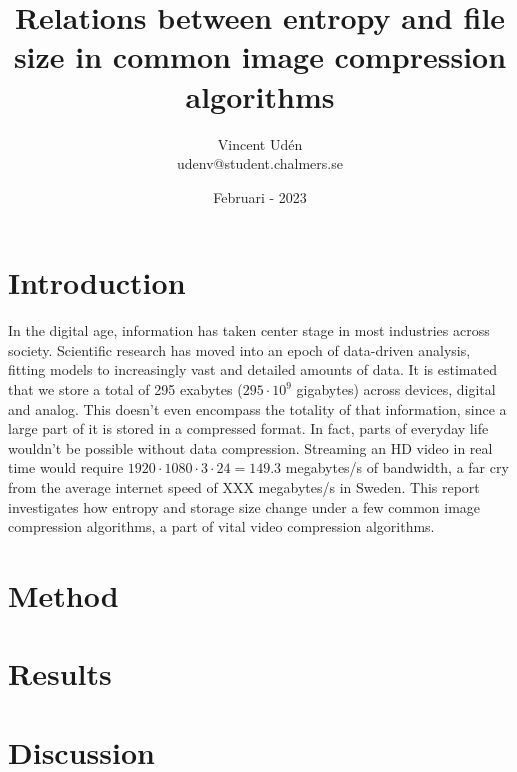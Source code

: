 \documentclass[a4paper, 12pt]{article}
\begin{document}
\title{Relations between entropy and file size in common image compression algorithms}
\author{Vincent Udén\\udenv@student.chalmers.se}
\date{Februari - 2023}

\maketitle

\section{Introduction}
In the digital age, information has taken center stage in most industries across society. Scientific research has moved into an epoch of data-driven analysis, fitting models to increasingly vast and detailed amounts of data. It is estimated that we store a total of 295 exabytes ($295 \cdot 10^9$ gigabytes) across devices, digital and analog. This doesn't even encompass the totality of that information, since a large part of it is stored in a compressed format. In fact, parts of everyday life wouldn't be possible without data compression. Streaming an HD video in real time would require $1920 \cdot 1080 \cdot 3\cdot 24 = 149.3$ megabytes/s of bandwidth, a far cry from the average internet speed of XXX megabytes/s in Sweden. This report investigates how entropy and storage size change under a few common image compression algorithms, a part of vital video compression algorithms.

\section{Method}

\section{Results}

\section{Discussion}

\end{document}
